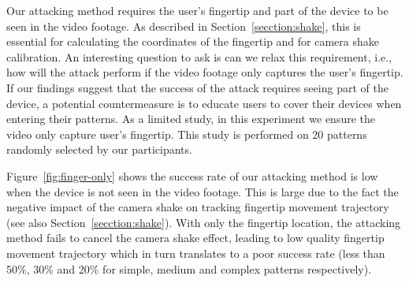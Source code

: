 Our attacking method requires the user's fingertip and part of the device to be seen in the video footage.  As
described in Section~\ref{secction:shake}, this is essential for calculating the coordinates of the fingertip and for
camera shake calibration. An interesting question to ask is can we relax this requirement, i.e., how will the attack
perform if the video footage only captures the user's fingertip. If our findings
suggest that the success of the attack requires seeing part of the device, a potential countermeasure is to educate users to cover their devices when entering their patterns.
As a limited study, in this experiment we ensure the video only capture user's fingertip. This study is performed on 20 patterns randomly selected by our participants.

Figure~\ref{fig:finger-only} shows the success rate of our attacking method is low when the device is not seen in the video footage.
This is large due to the fact the negative impact of the camera shake on tracking fingertip movement trajectory (see also Section~\ref{secction:shake}).
With only the fingertip location, the attacking method fails to cancel the camera shake effect, leading to low quality fingertip movement trajectory
which in turn translates to a poor success rate (less than 50\%, 30\% and 20\% for simple, medium and complex patterns respectively).


